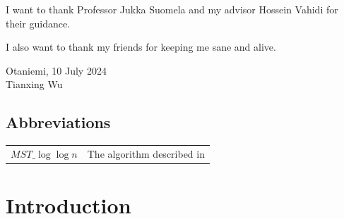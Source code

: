 \documentclass[english, 12pt, a4paper, elec, utf8, a-2b, online]{aaltothesis}
\date{10 July 2024}
\newcommand{\mstalgo}{$MST\_\log\log{n}$}
\begin{document}
\makecoverpage

\makecopyrightpage

\clearpage

\begin{abstractpage}[english]
	\abstracttext{}
\end{abstractpage}

\newpage

\dothesispagenumbering{}

I want to thank Professor Jukka Suomela and my advisor Hossein Vahidi for their guidance.

I also want to thank my friends for keeping me sane and alive.

\vspace{5cm}
Otaniemi, 10 July 2024\\

\vspace{5mm}
{\hfill Tianxing Wu \hspace{1cm}}

\newpage


\thesistableofcontents




\subsection*{Abbreviations}

\begin{tabular}{ll}
\mstalgo         & The algorithm described in \cite{MSTLogLogn} \\
\end{tabular}

\cleardoublepage

\section{Introduction}
\label{sec:intro}

\thispagestyle{empty}
\end{document}
